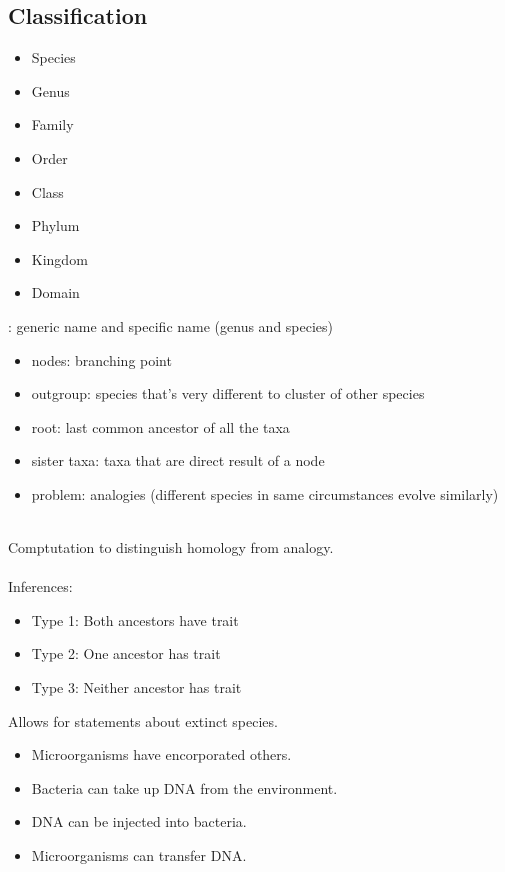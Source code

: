 \documentclass{article}
\theoremstyle{sltheorem}
\begin{document}
\subsection{Classification}
\begin{itemize}
    \item Species
    \item Genus
    \item Family
    \item Order
    \item Class
    \item Phylum
    \item Kingdom
    \item Domain
\end{itemize}
: generic name and specific name (genus and species)\\
\begin{itemize}
    \item nodes: branching point
    \item outgroup: species that's very different to cluster of other species
    \item root: last common ancestor of all the taxa
    \item sister taxa: taxa that are direct result of a node
    \item problem: analogies (different species in same circumstances evolve similarly)
\end{itemize}
\\
Comptutation to distinguish homology from analogy.\\
\\
Inferences:
\begin{itemize}
    \item Type 1: Both ancestors have trait
    \item Type 2: One ancestor has trait
    \item Type 3: Neither ancestor has trait
\end{itemize}
Allows for statements about extinct species.\\
\begin{itemize}
    \item Microorganisms have encorporated others.
    \item Bacteria can take up DNA from the environment.
    \item DNA can be injected into bacteria.
    \item Microorganisms can transfer DNA.
\end{itemize}
\end{document}
